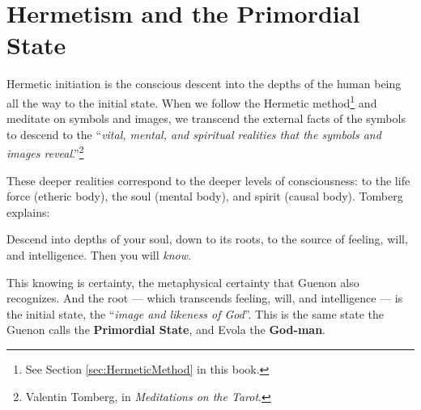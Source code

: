 \section{Hermetism and the Primordial State}

Hermetic initiation is the conscious descent into the depths of the human being all the way to the initial state. When we follow the Hermetic method\footnote{See Section \ref{sec:HermeticMethod} in this book.} and meditate on symbols and images, we transcend the external facts of the symbols to descend to the ``\emph{vital, mental, and spiritual realities that the symbols and images reveal}.''\footnote{Valentin Tomberg, in \textit{Meditations on the Tarot}.}

These deeper realities correspond to the deeper levels of consciousness: to the life force (etheric body), the soul (mental body), and spirit (causal body). Tomberg explains:

\begin{quotex}
Descend into depths of your soul, down to its roots, to the source of feeling, will, and intelligence. Then you will \emph{know}.
\end{quotex}


This knowing is certainty, the metaphysical certainty that Guenon also recognizes. And the root --- which transcends feeling, will, and intelligence --- is the initial state, the ``\emph{image and likeness of God}''. This is the same state the Guenon calls the \textbf{Primordial State}, and Evola the \textbf{God-man}.



